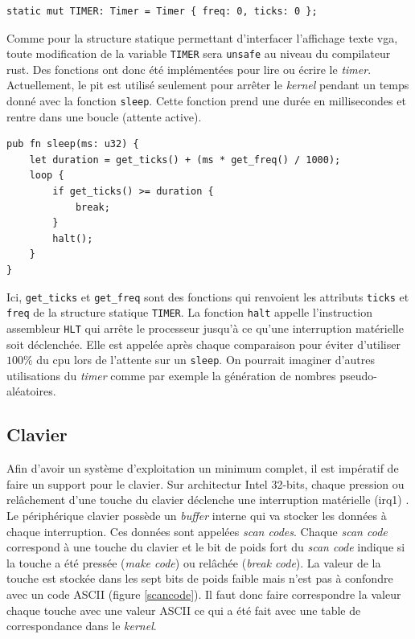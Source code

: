 \begin{verbatim}
static mut TIMER: Timer = Timer { freq: 0, ticks: 0 };
\end{verbatim}

Comme pour la structure statique permettant d'interfacer l'affichage texte \acrshort{vga},
toute modification de la variable \texttt{TIMER} sera \texttt{unsafe}
au niveau du compilateur rust. Des fonctions ont donc été implémentées pour lire
ou écrire le \textit{timer}. Actuellement, le \acrshort{pit} est utilisé seulement
pour arrêter le \textit{kernel} pendant un temps donné avec la fonction \texttt{sleep}.
Cette fonction prend une durée en millisecondes et rentre dans une boucle (attente
active).

\begin{verbatim}
pub fn sleep(ms: u32) {
    let duration = get_ticks() + (ms * get_freq() / 1000);
    loop {
        if get_ticks() >= duration {
            break;
        }
        halt();
    }
}
\end{verbatim}

Ici, \texttt{get_ticks} et \texttt{get_freq} sont des fonctions
qui renvoient les attributs \texttt{ticks} et \texttt{freq}
de la structure statique \texttt{TIMER}. La fonction \texttt{halt}
appelle l'instruction assembleur \texttt{HLT} qui arrête le processeur
jusqu'à ce qu'une interruption matérielle soit déclenchée. Elle est appelée après
chaque comparaison pour éviter d'utiliser $100\%$ du \acrshort{cpu} lors de l'attente
sur un \texttt{sleep}. On pourrait imaginer d'autres utilisations du
\textit{timer} comme par exemple la génération de nombres pseudo-aléatoires.


\subsection{Clavier}
Afin d'avoir un système d'exploitation un minimum complet, il est impératif
de faire un support pour le clavier. Sur architectur Intel 32-bits, chaque
pression ou relâchement d'une touche du clavier déclenche une interruption
matérielle (\acrshort{irq}1) \cite{ref42}. Le périphérique clavier possède un
\textit{buffer} interne qui va stocker les données à chaque interruption. Ces données
sont appelées \textit{scan codes}. Chaque \textit{scan code} correspond à une
touche du clavier et le bit de poids fort du \textit{scan code} indique si
la touche a été pressée (\textit{make code}) ou relâchée (\textit{break code}).
La valeur de la touche est stockée dans les sept bits de poids faible mais n'est
pas à confondre avec un code ASCII (figure \ref{scancode}). Il faut donc faire
correspondre la valeur chaque touche avec une valeur ASCII ce qui a été fait avec
une table de correspondance dans le \textit{kernel}.

